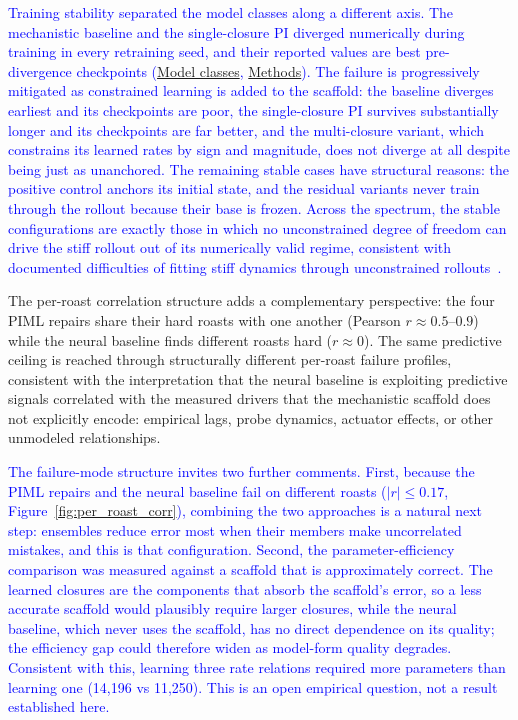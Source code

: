 \documentclass[fleqn,10pt]{wlscirep}
\newcommand{\rev}[1]{\textcolor{blue}{#1}}
\newcommand{\Methods}{\hyperref[sec:methods]{Methods}}
\begin{document}
\rev{Training stability separated the model classes along a different axis. The mechanistic baseline and the single-closure PI diverged numerically during training in every retraining seed, and their reported values are best pre-divergence checkpoints (\hyperref[sec:model_classes]{Model classes}, \Methods). The failure is progressively mitigated as constrained learning is added to the scaffold: the baseline diverges earliest and its checkpoints are poor, the single-closure PI survives substantially longer and its checkpoints are far better, and the multi-closure variant, which constrains its learned rates by sign and magnitude, does not diverge at all despite being just as unanchored. The remaining stable cases have structural reasons: the positive control anchors its initial state, and the residual variants never train through the rollout because their base is frozen. Across the spectrum, the stable configurations are exactly those in which no unconstrained degree of freedom can drive the stiff rollout out of its numerically valid regime, consistent with documented difficulties of fitting stiff dynamics through unconstrained rollouts~\cite{kim2021stiff}.}

The per-roast correlation structure adds a complementary perspective: the four PIML repairs share their hard roasts with one another (Pearson $r \approx 0.5$--$0.9$) while the neural baseline finds different roasts hard ($r \approx 0$). The same predictive ceiling is reached through structurally different per-roast failure profiles, consistent with the interpretation that the neural baseline is exploiting predictive signals correlated with the measured drivers that the mechanistic scaffold does not explicitly encode: empirical lags, probe dynamics, actuator effects, or other unmodeled relationships.

\rev{The failure-mode structure invites two further comments. First, because the PIML repairs and the neural baseline fail on different roasts ($|r| \le 0.17$, Figure~\ref{fig:per_roast_corr}), combining the two approaches is a natural next step: ensembles reduce error most when their members make uncorrelated mistakes, and this is that configuration. Second, the parameter-efficiency comparison was measured against a scaffold that is approximately correct. The learned closures are the components that absorb the scaffold's error, so a less accurate scaffold would plausibly require larger closures, while the neural baseline, which never uses the scaffold, has no direct dependence on its quality; the efficiency gap could therefore widen as model-form quality degrades. Consistent with this, learning three rate relations required more parameters than learning one (14,196 vs 11,250). This is an open empirical question, not a result established here.}
\end{document}

